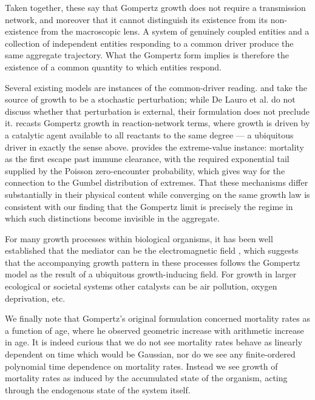 \documentclass{article}
\begin{document}
Taken together, these say that Gompertz growth does not require a transmission network, and moreover that it cannot distinguish its existence from its non-existence from the macroscopic lens. A system of genuinely coupled entities and a collection of independent entities responding to a common driver produce the same aggregate trajectory. What the Gompertz form implies is therefore the existence of a common quantity to which entities respond.

Several existing models are instances of the common-driver reading. \citet{sacher1956statistical} and \citet{de2014stochastic} take the source of growth to be a stochastic perturbation; while De Lauro et al. do not discuss whether that perturbation is external, their formulation does not preclude it. \citet{markov2019reaction} recasts Gompertz growth in reaction-network terms, where growth is driven by a catalytic agent available to all reactants to the same degree — a ubiquitous driver in exactly the sense above. \citet{shklovskii2005simple} provides the extreme-value instance: mortality as the first escape past immune clearance, with the required exponential tail supplied by the Poisson zero-encounter probability, which gives way for the connection to the Gumbel distribution of extremes. That these mechanisms differ substantially in their physical content while converging on the same growth law is consistent with our finding that the Gompertz limit is precisely the regime in which such distinctions become invisible in the aggregate.

For many growth processes within biological organisms, it has been well established that the mediator can be the electromagnetic field \cite{becker1984electromagnetic}, which suggests that the accompanying growth pattern in these processes follows the Gompertz model as the result of a ubiquitous growth-inducing field. For growth in larger ecological or societal systems other catalysts can be air pollution, oxygen deprivation, etc. 

We finally note that Gompertz's original formulation concerned mortality rates as a function of age, where he observed geometric increase with arithmetic increase in age. It is indeed curious that we do not see mortality rates behave as linearly dependent on time which would be Gaussian, nor do we see any finite-ordered polynomial time dependence on mortality rates. Instead we see growth of mortality rates as induced by the accumulated state of the organism, acting through the endogenous state of the system itself.
\end{document}
